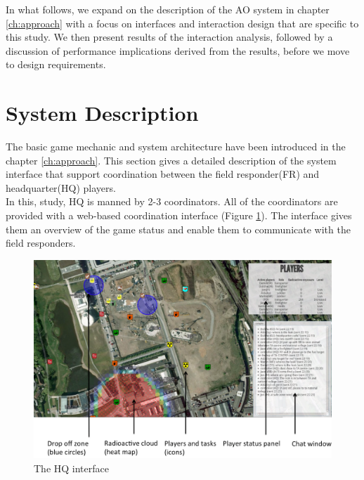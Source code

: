 In what follows, we expand on the description of the \ac{AO} system in chapter \ref{ch:approach} with a focus on interfaces and interaction design that are specific to this study. We then present results of the interaction analysis, followed by a discussion of performance implications derived from the results, before we move to design requirements. \\

\section{System Description}\label{sec:study3system}
The basic game mechanic and system architecture have been introduced in the chapter \ref{ch:approach}. This section gives a detailed description of the system interface that support coordination between the field responder(FR) and headquarter(HQ) players. \\

In this, study, HQ is manned by 2-3 coordinators. All of the coordinators are provided with a web-based coordination interface (Figure \ref{fig:HQinterface}). The interface gives them an overview of the game status and enable them to communicate with the field responders. \\

\begin{figure}[h]
  \centering
  \includegraphics[width=1\textwidth]{img/study1/webinterface}
  \caption{The HQ interface}
  \label{fig:HQinterface}
\end{figure}

